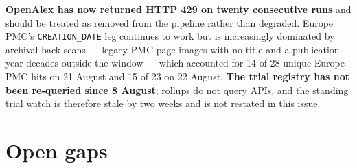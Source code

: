 \documentclass[10pt]{article}
\begin{document}
\vspace{1.2mm}
\textbf{OpenAlex has now returned HTTP 429 on twenty consecutive runs} and should be
treated as removed from the pipeline rather than degraded. Europe PMC's
\texttt{CREATION\_DATE} leg continues to work but is increasingly dominated by archival
back-scans --- legacy PMC page images with no title and a publication year decades outside
the window --- which accounted for 14 of 28 unique Europe PMC hits on 21 August and 15 of
23 on 22 August. \textbf{The trial registry has not been re-queried since 8 August};
rollups do not query APIs, and the standing trial watch is therefore stale by two weeks
and is not restated in this issue.

\vspace{3mm}
\section*{\sffamily\bfseries\color{Deep}Open gaps}
\vspace{-1.5mm}{\color{Teal}\rule{\linewidth}{1.1pt}}\vspace{2.5mm}
\end{document}
